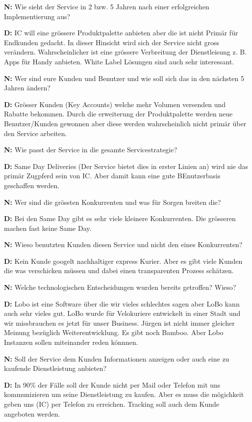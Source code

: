 \textbf{N:} Wie sieht der Service in 2 bzw. 5 Jahren nach einer erfolgreichen Implementierung aus?

\textbf{D:} IC will eine grössere Produktpalette anbieten aber die ist nicht Primär für Endkunden gedacht. In dieser Hinsicht wird sich der Service nicht gross verändern. Wahrscheinlicher ist eine grössere Verbreitung der Dienstleisung z. B. Apps für Handy anbieten. White Label Lösungen sind auch sehr interessant.

\textbf{N:} Wer sind eure Kunden und Benutzer und wie soll sich das in den nächsten 5 Jahren ändern?

\textbf{D:} Grösser Kunden (Key Accounts) welche mehr Volumen versenden und Rabatte bekommen. Durch die erweiterung der Produktpalette werden neue Benutzer/Kunden gewonnen aber diese werden wahrscheinlich nicht primär über den Service arbeiten.

\textbf{N:} Wie passt der Service in die gesamte Servicestrategie?

\textbf{D:} Same Day Deliveries (Der Service bietet dies in erster Linien an) wird nie das primär Zugpferd sein von IC. Aber damit kann eine gute BEnutzerbasis geschaffen werden.

\textbf{N:} Wer sind die grössten Konkurrenten und was für Sorgen breiten die?

\textbf{D:} Bei den Same Day gibt es sehr viele kleinere Konkurrenten. Die grösseren machen fast keine Same Day.

\textbf{N:} Wieso benutzten Kunden diesen Service und nicht den eines Konkurrenten?

\textbf{D:} Kein Kunde googelt nachhaltiger express Kurier. Aber es gibt viele Kunden die was verschicken müssen und dabei einen transparenten Prozess schätzen.

\textbf{N:} Welche technologischen Entscheidungen wurden bereits getroffen? Wieso?

\textbf{D:} Lobo ist eine Software über die wir vieles schlechtes sagen aber LoBo kann auch sehr vieles gut. LoBo wurde für Velokuriere entwickelt in einer Stadt und wir missbrauchen es jetzt für unser Business. Jürgen ist nicht immer gleicher Meinung bezüglich Weiterentwicklung. Es gibt noch Bamboo. Aber Lobo Instanzen sollen miteinander reden könnnen.

\textbf{N:} Soll der Service dem Kunden Informationen anzeigen oder auch eine zu kaufende Dienstleistung anbieten?

\textbf{D:} In 90\% der Fälle soll der Kunde nicht per Mail oder Telefon mit uns kommunizieren um seine Dienstleistung zu kaufen. Aber es muss die mögichkeit geben uns (IC) per Telefon zu erreichen. Tracking soll auch dem Kunde angeboten werden.

